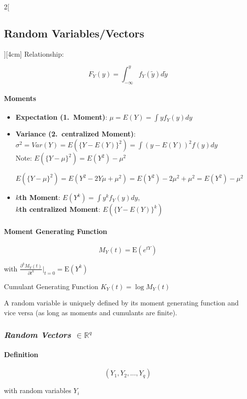 \documentclass[8pt]{extarticle}
\begin{document}
\begin{multicols}{2}[\subsection{Random Variables/Vectors}][4cm]
Relationship:

$$F_Y(y) = \int_{-\infty}^{y} f_Y(\tilde{y})d\tilde{y}$$



\paragraph{Moments}

\begin{itemize}
\item \textbf{Expectation (1.\ Moment)}: $\mu = E(Y) = \int y f_Y(y)dy$
\item \textbf{Variance (2.\ centralized Moment)}: $\sigma^2 = Var(Y) = E(\{Y-E(Y)\}^2) = \int (y - E(Y))^2 f(y) dy$ \\
Note: $E(\{Y-\mu\}^2) = E(Y^2) - \mu^2$
\begin{Proof}
$E(\{Y-\mu\}^2) = E(Y^2 - 2Y\mu + \mu^2) = E(Y^2) - 2\mu^2 + \mu^2 = E(Y^2) - \mu^2$
\end{Proof}
\item \textbf{$k$th Moment}: $E(Y^k) = \int y^k f_Y(y) dy$,\\ \textbf{$k$th centralized Moment}: $E(\{Y-E(Y)\}^k)$
\end{itemize}

\paragraph{Moment Generating Function }

$$M_Y(t) = \mathrm{E}(e^{tY})$$

with $\frac{\partial^kM_Y(t)}{\partial t^k} \bigg|_{t = 0} = \mathrm{E}(Y^k)$ 

Cumulant Generating Function $K_Y(t) = \log M_Y(t)$

\noindent A random variable is uniquely defined by its moment generating function and vice versa (as long as moments and cumulants are finite).
  
\subsubsection*{\textit{Random Vectors $\in \mathbb{R}^q$}}

\paragraph{Definition}

$$(Y_1,Y_2,...,Y_q)$$ 

with random variables $Y_i$ 


\end{multicols}
\end{document}
